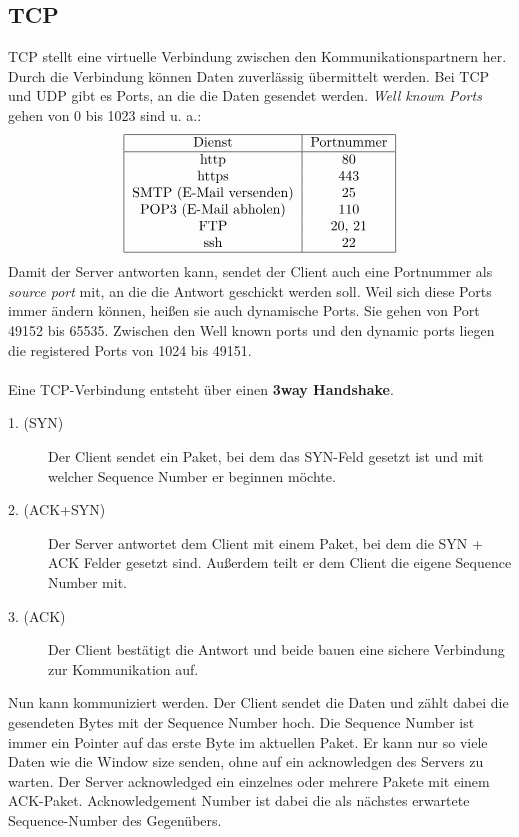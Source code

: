 \documentclass[a4paper,10pt]{scrartcl}
\begin{document}
    \subsection{TCP}
        TCP stellt eine virtuelle Verbindung zwischen den Kommunikationspartnern her. Durch die Verbindung können Daten zuverlässig übermittelt werden. Bei TCP und UDP gibt es Ports, an die die Daten gesendet werden. \emph{Well known Ports} gehen von 0 bis 1023 sind u. a.:\\
        \[
        \begin{tabular}{|c|c|}
            \hline
            Dienst & Portnummer \\
            \hline
            http & 80 \\
            https & 443 \\
            SMTP (E-Mail versenden) & 25\\
            POP3 (E-Mail abholen) & 110\\
            FTP & 20, 21 \\
            ssh & 22 \\
            \hline
        \end{tabular}  \\
        \]
        Damit der Server antworten kann, sendet der Client auch eine Portnummer als \emph{source port} mit, an die die Antwort geschickt werden soll. Weil sich diese Ports immer ändern können, heißen sie auch dynamische Ports. Sie gehen von Port 49152 bis 65535. Zwischen den Well known ports und den dynamic ports liegen die registered Ports von 1024 bis 49151.\\ \\
        Eine TCP-Verbindung entsteht über einen \textbf{3way Handshake}.
        \begin{description}
        \item[1. (SYN)] Der Client sendet ein Paket, bei dem das SYN-Feld gesetzt ist und mit welcher Sequence Number er beginnen möchte.
        \item[2. (ACK+SYN)] Der Server antwortet dem Client mit einem Paket, bei dem die SYN + ACK Felder gesetzt sind. Außerdem teilt er dem Client die eigene Sequence Number mit.
        \item[3. (ACK)] Der Client bestätigt die Antwort und beide bauen eine sichere Verbindung zur Kommunikation auf.
        \end{description}
        Nun kann kommuniziert werden. Der Client sendet die Daten und zählt dabei die gesendeten Bytes mit der Sequence Number hoch. Die Sequence Number ist immer ein Pointer auf das erste Byte im aktuellen Paket. Er kann nur so viele Daten wie die Window size senden, ohne auf ein acknowledgen des Servers zu warten. Der Server acknowledged ein einzelnes oder mehrere Pakete mit einem ACK-Paket. Acknowledgement Number ist dabei die als nächstes erwartete Sequence-Number des Gegenübers.\\
\end{document}
